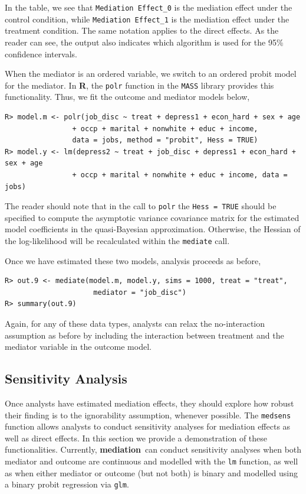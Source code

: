 \documentclass[11pt,letterpaper]{article}
\theoremstyle{plain}
\newcommand\bR{{\bf R}}
\newcommand\bmediation{{\bf mediation}}
\begin{document}
\noindent In the table, we see that \texttt{Mediation Effect\_0} is
the mediation effect under the control condition, while
\texttt{Mediation Effect\_1} is the mediation effect under the
treatment condition.  The same notation applies to the direct effects.
As the reader can see, the output also indicates which algorithm is
used for the 95\% confidence intervals.

When the mediator is an ordered variable, we switch to an ordered
probit model for the mediator.  In \bR, the \texttt{polr} function
in the \texttt{MASS} library provides this functionality.  Thus, we
fit the outcome and mediator models below,
\begin{verbatim}
R> model.m <- polr(job_disc ~ treat + depress1 + econ_hard + sex + age 
                + occp + marital + nonwhite + educ + income, 
                data = jobs, method = "probit", Hess = TRUE)
R> model.y <- lm(depress2 ~ treat + job_disc + depress1 + econ_hard + sex + age 
                + occp + marital + nonwhite + educ + income, data = jobs)
\end{verbatim}
The reader should note that in the call to \texttt{polr} the
\texttt{Hess = TRUE} should be specified to compute the asymptotic variance
covariance matrix for the estimated model coefficients in the quasi-Bayesian
approximation.  Otherwise, the Hessian of the log-likelihood will be recalculated
within the {\tt mediate} call.  

Once we have estimated these two models, analysis proceeds as before,
\begin{verbatim}
R> out.9 <- mediate(model.m, model.y, sims = 1000, treat = "treat",
                     mediator = "job_disc")
R> summary(out.9)
\end{verbatim}
Again, for any of these data types, analysts can relax the
no-interaction assumption as before by including the interaction
between treatment and the mediator variable in the outcome model.

\subsection{Sensitivity Analysis}

Once analysts have estimated mediation effects, they should explore how 
robust their finding is to the ignorability assumption, whenever possible.
The \texttt{medsens} function allows analysts to conduct sensitivity
analyses for mediation effects as well as direct effects.  
In this section we provide a demonstration of these functionalities.
Currently, \bmediation\ can conduct sensitivity analyses when both mediator
and outcome are continuous and modelled with the {\tt lm} function, as well
as when either mediator or outcome (but not both) is binary and modelled using
a binary probit regression via {\tt glm}.
\end{document}
